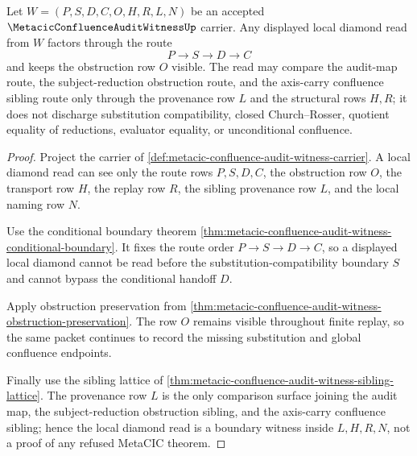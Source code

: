 \begin{theorem}
\label{thm:metacic-confluence-audit-witness-local-diamond-boundary}
Let $W=(P,S,D,C,O,H,R,L,N)$ be an accepted $\MetacicConfluenceAuditWitnessUp$ carrier. Any displayed local diamond read from $W$ factors through the route
$$
P \longrightarrow S \longrightarrow D \longrightarrow C
$$
and keeps the obstruction row $O$ visible. The read may compare the audit-map route, the subject-reduction obstruction route, and the axis-carry confluence sibling route only through the provenance row $L$ and the structural rows $H,R$; it does not discharge substitution compatibility, closed Church--Rosser, quotient equality of reductions, evaluator equality, or unconditional confluence.
\end{theorem}
\begin{proof}
Project the carrier of \autoref{def:metacic-confluence-audit-witness-carrier}. A local diamond read can see only the route rows $P,S,D,C$, the obstruction row $O$, the transport row $H$, the replay row $R$, the sibling provenance row $L$, and the local naming row $N$.

Use the conditional boundary theorem \autoref{thm:metacic-confluence-audit-witness-conditional-boundary}. It fixes the route order $P \to S \to D \to C$, so a displayed local diamond cannot be read before the substitution-compatibility boundary $S$ and cannot bypass the conditional handoff $D$.

Apply obstruction preservation from \autoref{thm:metacic-confluence-audit-witness-obstruction-preservation}. The row $O$ remains visible throughout finite replay, so the same packet continues to record the missing substitution and global confluence endpoints.

Finally use the sibling lattice of \autoref{thm:metacic-confluence-audit-witness-sibling-lattice}. The provenance row $L$ is the only comparison surface joining the audit map, the subject-reduction obstruction sibling, and the axis-carry confluence sibling; hence the local diamond read is a boundary witness inside $L,H,R,N$, not a proof of any refused MetaCIC theorem.
\end{proof}

